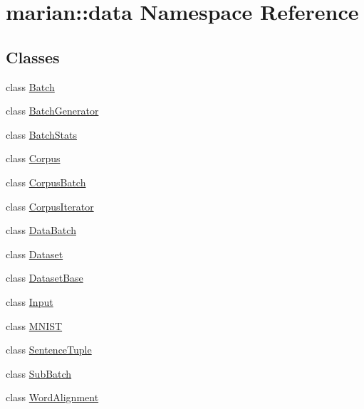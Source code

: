 \hypertarget{namespacemarian_1_1data}{}\section{marian\+:\+:data Namespace Reference}
\label{namespacemarian_1_1data}
\subsection*{Classes}
\begin{DoxyCompactItemize}
\item 
class \hyperlink{classmarian_1_1data_1_1Batch}{Batch}
\item 
class \hyperlink{classmarian_1_1data_1_1BatchGenerator}{Batch\+Generator}
\item 
class \hyperlink{classmarian_1_1data_1_1BatchStats}{Batch\+Stats}
\item 
class \hyperlink{classmarian_1_1data_1_1Corpus}{Corpus}
\item 
class \hyperlink{classmarian_1_1data_1_1CorpusBatch}{Corpus\+Batch}
\item 
class \hyperlink{classmarian_1_1data_1_1CorpusIterator}{Corpus\+Iterator}
\item 
class \hyperlink{classmarian_1_1data_1_1DataBatch}{Data\+Batch}
\item 
class \hyperlink{classmarian_1_1data_1_1Dataset}{Dataset}
\item 
class \hyperlink{classmarian_1_1data_1_1DatasetBase}{Dataset\+Base}
\item 
class \hyperlink{classmarian_1_1data_1_1Input}{Input}
\item 
class \hyperlink{classmarian_1_1data_1_1MNIST}{M\+N\+I\+ST}
\item 
class \hyperlink{classmarian_1_1data_1_1SentenceTuple}{Sentence\+Tuple}
\item 
class \hyperlink{classmarian_1_1data_1_1SubBatch}{Sub\+Batch}
\item 
class \hyperlink{classmarian_1_1data_1_1WordAlignment}{Word\+Alignment}
\end{DoxyCompactItemize}
